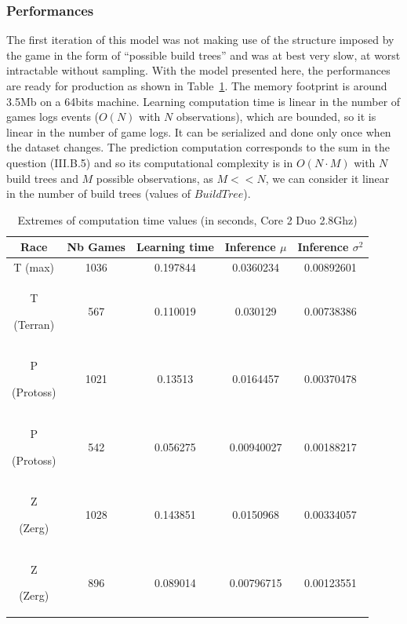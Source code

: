 \subsubsection{Performances}
The first iteration of this model was not making use of the structure imposed by the game in the form of ``possible build trees'' and was at best very slow, at worst intractable without sampling. With the model presented here, the performances are ready for production as shown in Table~\ref{CPU}. The memory footprint is around 3.5Mb on a 64bits machine. Learning computation time is linear in the number of games logs events ($O(N)$ with $N$ observations), which are bounded, so it is linear in the number of game logs. It can be serialized and done only once when the dataset changes. The prediction computation corresponds to the sum in the question (III.B.5) and so its computational complexity is in $O(N\cdot M)$ with $N$ build trees and $M$ possible observations, as $M << N$, we can consider it linear in the number of build trees (values of $BuildTree$).

\begin{table}[h]
\caption{Extremes of computation time values (in seconds, Core 2 Duo 2.8Ghz)}
\begin{center}
\begin{tabular}{|c|cc|cc|}
\hline
Race
& Nb Games
& Learning time
& Inference $\mu$
& Inference $\sigma^2$ \\ \hline
T (max) & 1036 & 0.197844 & 0.0360234 & 0.00892601 \\
T \begin{tiny}(Terran)\end{tiny} & 567 & 0.110019 & 0.030129 & 0.00738386 \\ 
P \begin{tiny}(Protoss)\end{tiny} & 1021 & 0.13513 & 0.0164457 & 0.00370478 \\
P \begin{tiny}(Protoss)\end{tiny} & 542 & 0.056275 & 0.00940027 & 0.00188217 \\ 
Z \begin{tiny}(Zerg)\end{tiny} & 1028 & 0.143851 & 0.0150968 & 0.00334057 \\
Z \begin{tiny}(Zerg)\end{tiny} & 896 & 0.089014 & 0.00796715 & 0.00123551 \\ \hline
\end{tabular}
\label{CPU}
\end{center}
\end{table}

